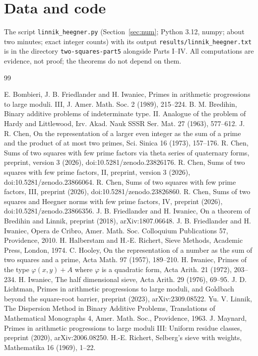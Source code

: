 \documentclass[11pt]{amsart}
\theoremstyle{definition}
\theoremstyle{remark}
\begin{document}
\section*{Data and code}
{\raggedright
The script \texttt{linnik\_heegner.py} (Section~\ref{sec:num}; Python 3.12, numpy; about two minutes; exact integer counts) with its output \texttt{results/linnik\_heegner.txt} is in the directory \texttt{two-squares-part5} alongside Parts I--IV. All computations are evidence, not proof; the theorems do not depend on them.
\par}

\begin{thebibliography}{99}\raggedright
{} E. Bombieri, J. B. Friedlander and H. Iwaniec, Primes in arithmetic progressions to large moduli. III, J. Amer. Math. Soc. 2 (1989), 215--224.
 B. M. Bredihin, Binary additive problems of indeterminate type. II. Analogue of the problem of Hardy and Littlewood, Izv. Akad. Nauk SSSR Ser. Mat. 27 (1963), 577--612.
 J. R. Chen, On the representation of a larger even integer as the sum of a prime and the product of at most two primes, Sci. Sinica 16 (1973), 157--176.
 R. Chen, Sums of two squares with few prime factors via theta series of quaternary forms, preprint, version 3 (2026), doi:10.5281/zenodo.23826176.
 R. Chen, Sums of two squares with few prime factors, II, preprint, version 3 (2026), doi:10.5281/zenodo.23866064.
 R. Chen, Sums of two squares with few prime factors, III, preprint (2026), doi:10.5281/zenodo.23826860.
 R. Chen, Sums of two squares and Heegner norms with few prime factors, IV, preprint (2026), doi:10.5281/zenodo.23866356.
 J. B. Friedlander and H. Iwaniec, On a theorem of Bredihin and Linnik, preprint (2018), arXiv:1807.06648.
 J. B. Friedlander and H. Iwaniec, Opera de Cribro, Amer. Math. Soc. Colloquium Publications 57, Providence, 2010.
 H. Halberstam and H.-E. Richert, Sieve Methods, Academic Press, London, 1974.
 C. Hooley, On the representation of a number as the sum of two squares and a prime, Acta Math. 97 (1957), 189--210.
 H. Iwaniec, Primes of the type $\varphi(x,y)+A$ where $\varphi$ is a quadratic form, Acta Arith. 21 (1972), 203--234.
 H. Iwaniec, The half dimensional sieve, Acta Arith. 29 (1976), 69--95.
 J. D. Lichtman, Primes in arithmetic progressions to large moduli, and Goldbach beyond the square-root barrier, preprint (2023), arXiv:2309.08522.
 Yu. V. Linnik, The Dispersion Method in Binary Additive Problems, Translations of Mathematical Monographs 4, Amer. Math. Soc., Providence, 1963.
 J. Maynard, Primes in arithmetic progressions to large moduli III: Uniform residue classes, preprint (2020), arXiv:2006.08250.
 H.-E. Richert, Selberg's sieve with weights, Mathematika 16 (1969), 1--22.
\end{thebibliography}
\end{document}

